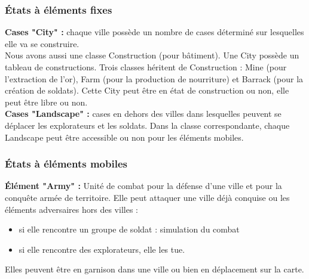 \documentclass[a4paper,12pt]{article}
\begin{document}
\subsubsection{États à éléments fixes}


\textbf{Cases "City" : } chaque ville possède un nombre de cases déterminé sur lesquelles elle va se construire.
\\
Nous avons aussi une classe Construction (pour bâtiment). Une City possède un tableau de constructions. Trois classes héritent de Construction : Mine (pour l'extraction de l'or), Farm (pour la production de nourriture) et Barrack (pour la création de soldats). Cette City peut être en état de construction ou non, elle peut être libre ou non. 
\\
     

\textbf{Cases "Landscape" :} cases en dehors des villes dans lesquelles peuvent se déplacer les explorateurs et les soldats. Dans la classe correspondante, chaque Landscape peut être accessible ou non pour les éléments mobiles.
\\
\subsubsection{États à éléments mobiles}

\textbf{Élément "Army" :} Unité de combat pour la défense d'une ville et pour la conquête armée de territoire. Elle peut attaquer une ville déjà conquise ou les éléments adversaires hors des villes : \begin{itemize}

\item si elle rencontre un groupe de soldat : simulation du combat

\item si elle rencontre des explorateurs, elle les tue.
\\
\end{itemize}
Elles peuvent être en garnison dans une ville ou bien en déplacement sur la carte.
\end{document}

